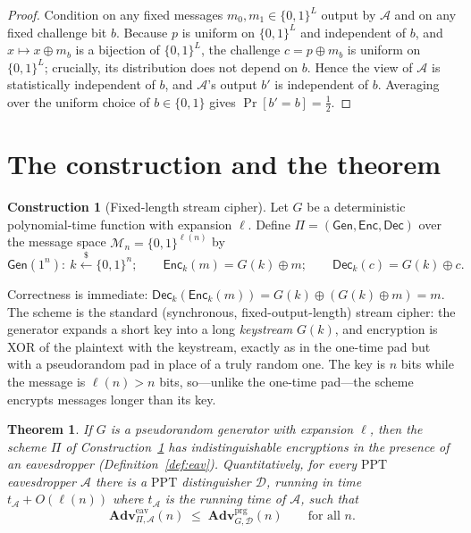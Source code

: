 \documentclass[11pt]{article}
\theoremstyle{plain}
\newtheorem{theorem}{Theorem}
\theoremstyle{definition}
\newtheorem{construction}{Construction}
\newcommand{\bit}{\{0,1\}}
\newcommand{\secp}{n}                       %
\newcommand{\adv}{\mathcal{A}}
\newcommand{\dist}{\mathcal{D}}
\newcommand{\Enc}{\mathsf{Enc}}
\newcommand{\Dec}{\mathsf{Dec}}
\newcommand{\Gen}{\mathsf{Gen}}
\newcommand{\PPT}{\mathrm{PPT}}
\newcommand{\getsr}{\overset{\$}{\leftarrow}}   %
\newcommand{\Adv}{\mathbf{Adv}}
\newcommand{\eav}{\mathrm{eav}}
\newcommand{\prg}{\mathrm{prg}}
\newcommand{\Pron}{\Pi}
\begin{document}
\begin{proof}
Condition on any fixed messages $m_0, m_1 \in \bit^{L}$ output by $\adv$ and on
any fixed challenge bit $b$. Because $p$ is uniform on $\bit^{L}$ and independent
of $b$, and $x \mapsto x \oplus m_b$ is a bijection of $\bit^{L}$, the challenge
$c = p \oplus m_b$ is uniform on $\bit^{L}$; crucially, its distribution does not
depend on $b$. Hence the view of $\adv$ is statistically independent of $b$, and
$\adv$'s output $b'$ is independent of $b$. Averaging over the uniform choice of
$b \in \bit$ gives $\Pr[b' = b] = \tfrac12$.
\end{proof}

\section{The construction and the theorem}

\begin{construction}[Fixed-length stream cipher]\label{con:cipher}
Let $G$ be a deterministic polynomial-time function with expansion $\ell$. Define
$\Pron = (\Gen, \Enc, \Dec)$ over the message space
$\mathcal{M}_\secp = \bit^{\ell(\secp)}$ by
\[
  \Gen(1^\secp)\colon\ k \getsr \bit^{\secp};
  \qquad
  \Enc_k(m) = G(k) \oplus m;
  \qquad
  \Dec_k(c) = G(k) \oplus c .
\]
\end{construction}

Correctness is immediate:
$\Dec_k(\Enc_k(m)) = G(k) \oplus (G(k) \oplus m) = m$. The scheme is the standard
(synchronous, fixed-output-length) stream cipher: the generator expands a short
key into a long \emph{keystream} $G(k)$, and encryption is XOR of the plaintext
with the keystream, exactly as in the one-time pad but with a pseudorandom pad in
place of a truly random one. The key is $\secp$ bits while the message is
$\ell(\secp) > \secp$ bits, so---unlike the one-time pad---the scheme encrypts
messages longer than its key.

\begin{theorem}\label{thm:main}
If $G$ is a pseudorandom generator with expansion $\ell$, then the scheme
$\Pron$ of Construction~\ref{con:cipher} has indistinguishable encryptions in the
presence of an eavesdropper (Definition~\ref{def:eav}). Quantitatively, for every
$\PPT$ eavesdropper $\adv$ there is a $\PPT$ distinguisher $\dist$, running in
time $t_\adv + O(\ell(\secp))$ where $t_\adv$ is the running time of $\adv$, such
that
\begin{equation}\label{eq:tight}
  \Adv^{\eav}_{\Pron,\adv}(\secp)
  \;\leq\;
  \Adv^{\prg}_{G,\dist}(\secp)
  \qquad\text{for all } \secp .
\end{equation}
\end{theorem}
\end{document}
